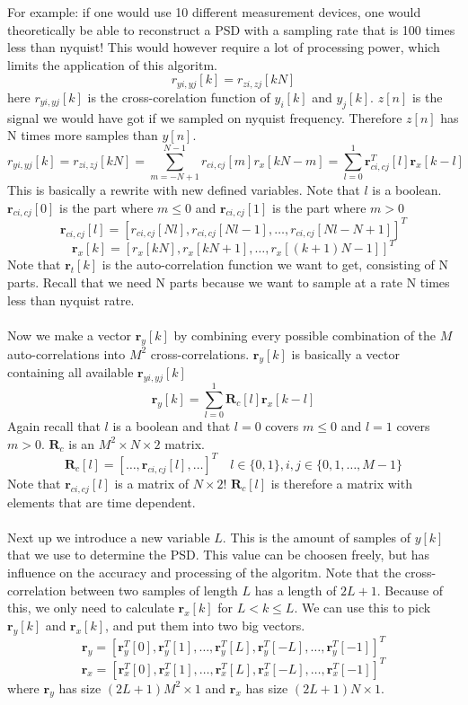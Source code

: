 \documentclass[report, oneside, a4paper, openany]{memoir}
\begin{document}
For example: if  one would use 10 different measurement devices, one would theoretically be able to reconstruct a PSD with a sampling rate that is 100 times less than nyquist! This would however require a lot of processing power, which limits the application of this algoritm.
$$
r_{yi,yj}[k] = r_{zi,zj}[kN]
$$
here $r_{yi,yj}[k]$ is the cross-corelation function of $y_i[k]$ and $y_j[k]$.
$z[n]$ is the signal we would have got if we sampled on nyquist frequency. Therefore $z[n]$ has N times more samples than $y[n]$.
$$
r_{yi,yj}[k] = r_{zi,zj}[kN] = \sum_{m=-N+1}^{N-1}r_{ci,cj}[m]r_x[kN-m] = \sum_{l=0}^1\mathbf{r}^T_{ci,cj}[l]\mathbf{r}_x[k-l]
$$
This is basically a rewrite with new defined variables. Note that $l$ is a boolean. $\mathbf{r}_{ci,cj}[0]$ is the part where $m\leq 0$ and $\mathbf{r}_{ci,cj}[1]$ is the part where $m > 0$ 
$$
\mathbf{r}_{ci,cj}[l] = [r_{ci,cj}[Nl], r_{ci,cj}[Nl-1], \dots, r_{ci,cj}[Nl-N+1]]^T
$$
$$
\mathbf{r}_x[k]= [r_x[kN],r_x[kN+1],\dots,r_x[(k+1)N-1]]^T
$$
Note that $\mathbf{r}_t[k]$ is the auto-correlation function we want to get, consisting of N parts. Recall that we need N parts because we want to sample at a rate N times less than nyquist ratre.\\
\\
Now we make a vector $\mathbf{r}_y[k]$ by combining every possible combination of the $M$ auto-correlations into $M^2$ cross-correlations. $\mathbf{r}_y[k]$ is basically a vector containing all available $\mathbf{r}_{yi,yj}[k]$
$$
\mathbf{r}_y[k]=\sum_{l=0}^1\mathbf{R}_c[l]\mathbf{r}_x[k-l]
$$
Again recall that $l$ is a boolean and that $l=0$ covers $m\leq 0$ and $l=1$ covers $m > 0$. $\mathbf{R}_c$ is an $M^2 \times N \times 2$ matrix.
$$
\mathbf{R}_c[l] = [\dots,\mathbf{r}_{ci,cj}[l],\dots]^T \quad l \in \{0,1\}, i,j \in \{0,1, \dots, M-1\}
$$
Note that $\mathbf{r}_{ci,cj}[l]$ is a matrix of $N \times 2$! $\mathbf{R}_c[l]$ is therefore a matrix with elements that are time dependent.\\
\\
Next up we introduce a new variable $L$. This is the amount of samples of $y[k]$ that we use to determine the PSD. This value can be choosen freely, 
but has influence on the accuracy and processing of the algoritm. 
Note that the cross-correlation between two samples of length $L$ has a length of $2L+1$. Because of this, we only need to calculate $\mathbf{r}_x[k]$ for $L<k\leq L$. We can use this to pick $\mathbf{r}_y[k]$ and $\mathbf{r}_x[k]$, and put them into two big vectors.
$$
\mathbf{r}_y = [\mathbf{r}^T_y[0],\mathbf{r}^T_y[1],\dots,\mathbf{r}^T_y[L],\mathbf{r}^T_y[-L],\dots,\mathbf{r}^T_y[-1]]^T
$$
$$
\mathbf{r}_x = [\mathbf{r}^T_x[0],\mathbf{r}^T_x[1],\dots,\mathbf{r}^T_x[L],\mathbf{r}^T_x[-L],\dots,\mathbf{r}^T_x[-1]]^T
$$
where $\mathbf{r}_y$ has size $(2L+1)M^2\times 1$ and $\mathbf{r}_x$ has size $(2L+1)N \times 1$. \\
\end{document}
